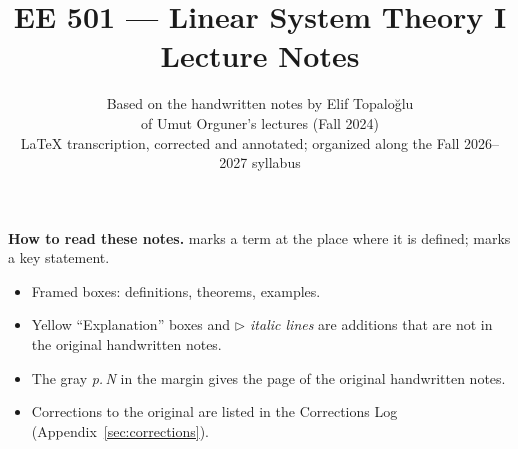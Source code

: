 \documentclass[11pt]{article}
\title{\textbf{EE 501 --- Linear System Theory I}\\[0.4em]\large Lecture Notes}
\author{Based on the handwritten notes by Elif Topalo\u{g}lu\\
of Umut Orguner's lectures (Fall 2024)\\[0.6em]
\small \LaTeX{} transcription, corrected and annotated; organized along the Fall 2026--2027 syllabus}
\date{}
\begin{document}
\maketitle

\begin{center}
\begin{minipage}{0.85\linewidth}
\small
\textbf{How to read these notes.}
 marks a term at the place where it is defined;  marks a key statement.
\begin{itemize}[nosep]
\item Framed boxes: \textcolor{blue!55!black}{definitions}, \textcolor{red!55!black}{theorems}, \textcolor{green!45!black}{examples}.
\item \textcolor{orange!60!black}{Yellow ``Explanation'' boxes} and \textit{$\triangleright$ italic lines} are additions that are not in the original handwritten notes.
\item The gray \textit{p.\,N} in the margin gives the page of the original handwritten notes.
\item Corrections to the original are listed in the Corrections Log (Appendix~\ref{sec:corrections}).
\end{itemize}
\end{minipage}
\end{center}

\tableofcontents
\clearpage
\end{document}
